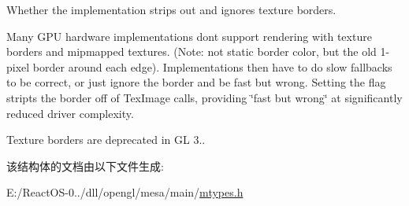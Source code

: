 Whether the implementation strips out and ignores texture borders.

Many G\+PU hardware implementations don\textquotesingle{}t support rendering with texture borders and mipmapped textures. (Note\+: not static border color, but the old 1-\/pixel border around each edge). Implementations then have to do slow fallbacks to be correct, or just ignore the border and be fast but wrong. Setting the flag stripts the border off of Tex\+Image calls, providing \char`\"{}fast but wrong\char`\"{} at significantly reduced driver complexity.

Texture borders are deprecated in GL 3.. 

该结构体的文档由以下文件生成\+:\begin{DoxyCompactItemize}
\item 
E\+:/\+React\+O\+S-\/0../dll/opengl/mesa/main/\hyperlink{mtypes_8h}{mtypes.\+h}\end{DoxyCompactItemize}
